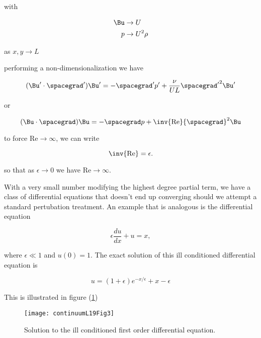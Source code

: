 with 

\begin{align}\label{eqn:continuumL19:570}
\Bu &\rightarrow U \\
p &\rightarrow U^2 \rho
\end{align}

as $x, y \rightarrow L$

performing a non-dimensionalization we have

\begin{equation}\label{eqn:continuumL19:590}
(\Bu' \cdot \spacegrad') \Bu' = -\spacegrad' p' + \frac{\nu}{U L} {\spacegrad'}^2 \Bu'
\end{equation}

or

\begin{equation}\label{eqn:continuumL19:610}
(\Bu \cdot \spacegrad) \Bu = -\spacegrad p + \inv{\text{Re}} {\spacegrad}^2 \Bu
\end{equation}

to force $\text{Re} \rightarrow \infty$, we can write

\begin{equation}\label{eqn:continuumL19:630}
\inv{\text{Re}} = \epsilon.
\end{equation}

so that as $\epsilon \rightarrow 0$ we have $\text{Re} \rightarrow \infty$.

With a very small number modifying the highest degree partial term, we have a class of differential equations that doesn't end up converging should we attempt a standard pertubation treatment.  An example that is analogous is the differential equation

\begin{equation}\label{eqn:continuumL19:650}
\epsilon \frac{du}{dx} + u = x,
\end{equation}

where $\epsilon \ll 1$ and $u(0) = 1$.  The exact solution of this ill conditioned differential equation is

\begin{equation}\label{eqn:continuumL19:670}
u = (1 + \epsilon) e^{-x/\epsilon} + x - \epsilon
\end{equation}

This is illustrated in figure (\ref{fig:continuumL19:continuumL19Fig3})
\begin{figure}[htp]
   \centering
   \texttt{[image: continuumL19Fig3]}
   \caption{Solution to the ill conditioned first order differential equation.}\label{fig:continuumL19:continuumL19Fig3}
\end{figure}

